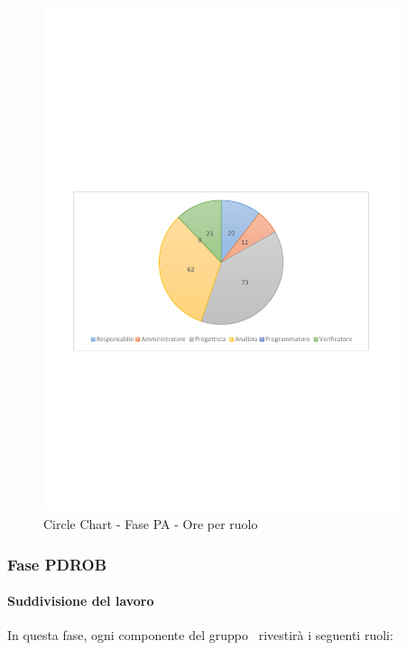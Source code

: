 \documentclass[../PianoProgetto.tex]{subfiles}
\begin{document}
	\begin{figure}[!h]
		\centering
		\includegraphics[width=0.93\textwidth , trim=2cm 9.5cm 2cm 11cm]{grafici/PA/PA-ore-ruolo}
			\caption{Circle Chart - Fase PA - Ore per ruolo}
		\label{fig:CircleChart-fasePA_ore_r}
	\end{figure}	
\vfill	
	\subsubsection{Fase PDROB}
				\paragraph{Suddivisione del lavoro}
					In questa fase, ogni componente del gruppo \leaf\ rivestirà i seguenti ruoli:
	
\end{document}
